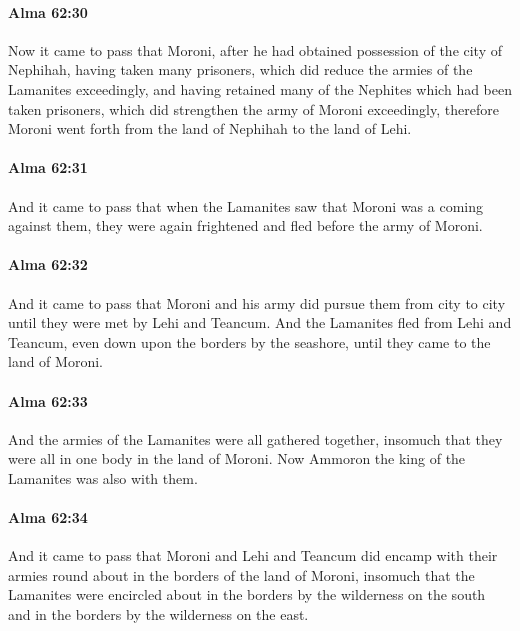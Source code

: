 		\paragraph{Alma 62:30} %
			\label{ALMA-62-30}

			Now it came to pass that Moroni,
			after he had obtained possession of the city of Nephihah,
			having taken many prisoners,
			which did reduce the armies of the Lamanites exceedingly,
			and having retained many of the Nephites which had been taken prisoners,
			which did strengthen the army of Moroni exceedingly,
			therefore Moroni went forth from the land of Nephihah to the land of Lehi.

		\paragraph{Alma 62:31} %
			\label{ALMA-62-31}

			And it came to pass that when the Lamanites saw
			that Moroni was a coming against them,
			they were again frightened and fled before the army of Moroni.

		\paragraph{Alma 62:32} %
			\label{ALMA-62-32}

			And it came to pass that Moroni and his army did pursue them from city to city
			until they were met by Lehi and Teancum.
			And the Lamanites fled from Lehi and Teancum,
			even down upon the borders by the seashore,
			until they came to the land of Moroni.

		\paragraph{Alma 62:33} %
			\label{ALMA-62-33}

			And the armies of the Lamanites were all gathered together,
			insomuch that they were all in one body in the land of Moroni.
			Now Ammoron the king of the Lamanites was also with them.

		\paragraph{Alma 62:34} %
			\label{ALMA-62-34}

			And it came to pass that Moroni and Lehi and Teancum did encamp
			with their armies round about in the borders of the land of Moroni,
			insomuch that the Lamanites were encircled about
			in the borders by the wilderness on the south
			and in the borders by the wilderness on the east.

